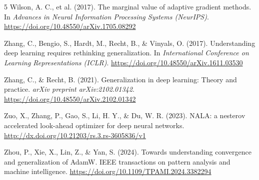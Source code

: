 \documentclass[10pt,twocolumn]{article}
\begin{document}
\begin{thebibliography}{5}
Wilson, A. C., et al. (2017). The marginal value of adaptive gradient methods. In \textit{Advances in Neural Information Processing Systems (NeurIPS)}. \url{https://doi.org/10.48550/arXiv.1705.08292}

Zhang, C., Bengio, S., Hardt, M., Recht, B., \& Vinyals, O. (2017). Understanding deep learning requires rethinking generalization. In \textit{International Conference on Learning Representations (ICLR)}. \url{https://doi.org/10.48550/arXiv.1611.03530}

Zhang, C., \& Recht, B. (2021). Generalization in deep learning: Theory and practice. \textit{arXiv preprint arXiv:2102.01342}. \url{https://doi.org/10.48550/arXiv.2102.01342}

Zuo, X., Zhang, P., Gao, S., Li, H. Y., \& Du, W. R. (2023). NALA: a nesterov accelerated look-ahead optimizer for deep neural networks. \url{http://dx.doi.org/10.21203/rs.3.rs-3605836/v1}

Zhou, P., Xie, X., Lin, Z., \& Yan, S. (2024). Towards understanding convergence and generalization of AdamW. IEEE transactions on pattern analysis and machine intelligence. \url{https://doi.org/10.1109/TPAMI.2024.3382294}

\end{thebibliography}
\end{document}
